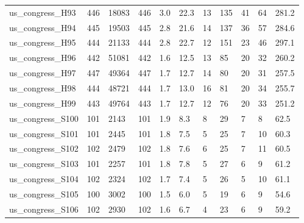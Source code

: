 \begin{longtable}{lllllllllll}
 us\_congress\_H93                                    & 446        & 18083     & 446   & 3.0    & 22.3   & 13    & 135    & 41     & 64     & 281.2   \\
 us\_congress\_H94                                    & 445        & 19503     & 445   & 2.8    & 21.6   & 14    & 137    & 36     & 57     & 284.6   \\
 us\_congress\_H95                                    & 444        & 21133     & 444   & 2.8    & 22.7   & 12    & 151    & 23     & 46     & 297.1   \\
 us\_congress\_H96                                    & 442        & 51081     & 442   & 1.6    & 12.5   & 13    & 85     & 20     & 32     & 260.2   \\
 us\_congress\_H97                                    & 447        & 49364     & 447   & 1.7    & 12.7   & 14    & 80     & 20     & 31     & 257.5   \\
 us\_congress\_H98                                    & 444        & 48721     & 444   & 1.7    & 13.0   & 16    & 81     & 20     & 34     & 255.7   \\
 us\_congress\_H99                                    & 443        & 49764     & 443   & 1.7    & 12.7   & 12    & 76     & 20     & 33     & 251.2   \\
 us\_congress\_S100                                   & 101        & 2143      & 101   & 1.9    & 8.3    & 8     & 29     & 7      & 8      & 62.5    \\
 us\_congress\_S101                                   & 101        & 2445      & 101   & 1.8    & 7.5    & 5     & 25     & 7      & 10     & 60.3    \\
 us\_congress\_S102                                   & 102        & 2479      & 102   & 1.8    & 7.6    & 6     & 25     & 7      & 11     & 60.5    \\
 us\_congress\_S103                                   & 101        & 2257      & 101   & 1.8    & 7.8    & 5     & 27     & 6      & 9      & 61.2    \\
 us\_congress\_S104                                   & 102        & 2324      & 102   & 1.7    & 7.4    & 5     & 26     & 5      & 10     & 61.1    \\
 us\_congress\_S105                                   & 100        & 3002      & 100   & 1.5    & 6.0    & 5     & 19     & 6      & 9      & 54.6    \\
 us\_congress\_S106                                   & 102        & 2930      & 102   & 1.6    & 6.7    & 4     & 23     & 6      & 9      & 59.2    \\

\end{longtable}
